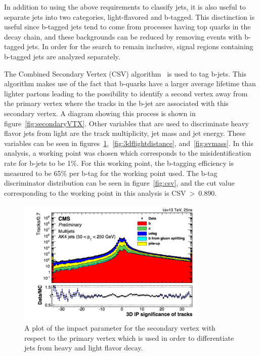 In addition to using the above requirements to classify jets, it is also useful to separate jets into two categories, light-flavored and b-tagged.
This disctinction is useful since b-tagged jets tend to come from processes having top quarks in the decay chain,
and these backgrounds can be reduced by removing events with b-tagged jets.
In order for the search to remain inclusive, signal regions containing b-tagged jets are analyzed separately.

The Combined Secondary Vertex (CSV) algorithm~\cite{btagging}\cite{btagging2015} is used to tag b-jets.
This algorithm makes use of the fact that b-quarks have a larger average lifetime than lighter partons
leading to the possibility to identify a second vertex away from the primary vertex where the tracks in the b-jet are associated with this secondary vertex.
A diagram showing this process is shown in figure~\ref{fig:secondaryVTX}.
Other variables that are used to discriminate heavy flavor jets from light are the track multiplicity, jet mass and jet energy.
These variables can be seen in figures~\ref{fig:3dip},~\ref{fig:3dflightdistance}, and~\ref{fig:svmass}.
In this analysis, a working point was chosen which corresponds to the misidentification rate for b-jets to be 1\%.
For this working point, the b-tagging efficiency is measured to be 65\% per b-tag for the working point used. 
The b-tag discriminator distribution can be seen in figure~\ref{fig:csv},
and the cut value corresponding to the working point in this analysis is CSV$~>~$0.890.

\begin{figure}[!ht]
  \begin{center}
      \includegraphics[width=0.8\textwidth]{evtsel/figs/CMS-PAS-BTV-15-001_Figure_001-a.pdf}
    \caption{
      \label{fig:3dip}
      A plot of the impact parameter for the secondary vertex with respect to the primary vertex
      which is used in order to differentiate jets from heavy and light flavor decay.
    }
  \end{center}
\end{figure}

